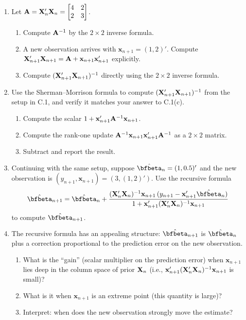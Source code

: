 \documentclass{article}
\begin{document}
\begin{enumerate}[label=\textbf{C.\arabic*},leftmargin=*,itemsep=10pt]

\item  Let ${\mathbf A} = {\mathbf X}_n'{\mathbf X}_n = \begin{bmatrix}4 & 2\\ 2 & 3\end{bmatrix}$.
\begin{enumerate}[label=(\alph*)]
  \item Compute ${\mathbf A}^{-1}$ by the $2\times 2$ inverse formula.
  \item A new observation arrives with $\bm x_{n+1} = (1, 2)'$.  Compute ${\mathbf X}_{n+1}'{\mathbf X}_{n+1} = {\mathbf A} + \mathbf x_{n+1}\mathbf x_{n+1}'$ explicitly.
  \item Compute $({\mathbf X}_{n+1}'{\mathbf X}_{n+1})^{-1}$ directly using the $2\times 2$ inverse formula.
\end{enumerate}

\item  Use the Sherman--Morrison formula to compute $({\mathbf X}_{n+1}'{\mathbf X}_{n+1})^{-1}$ from the setup in C.1, and verify it matches your answer to C.1(c).
\begin{enumerate}[label=(\alph*)]
  \item Compute the scalar $1 + \mathbf x_{n+1}'{\mathbf A}^{-1}\mathbf x_{n+1}$.
  \item Compute the rank-one update ${\mathbf A}^{-1}\mathbf x_{n+1}\mathbf x_{n+1}'{\mathbf A}^{-1}$ as a $2\times 2$ matrix.
  \item Subtract and report the result.
\end{enumerate}

\item  Continuing with the same setup, suppose $\hat\bfbeta_n = (1, 0.5)'$ and the new observation is $(y_{n+1}, \bm x_{n+1}) = (3, (1, 2)')$.  Use the recursive formula
$$\hat\bfbeta_{n+1} = \hat\bfbeta_n + \frac{(\bfX_n'\bfX_n)^{-1}\bm x_{n+1}\,(y_{n+1} - \bm x_{n+1}'\hat\bfbeta_n)}{1 + \bm x_{n+1}'(\bfX_n'\bfX_n)^{-1}\bm x_{n+1}}$$
to compute $\hat\bfbeta_{n+1}$.

\item  The recursive formula has an appealing structure: $\hat\bfbeta_{n+1}$ is $\hat\bfbeta_n$ plus a correction proportional to the prediction error on the new observation.
\begin{enumerate}[label=(\alph*)]
  \item What is the ``gain'' (scalar multiplier on the prediction error) when $\bm x_{n+1}$ lies deep in the column space of prior ${\mathbf X}_n$ (i.e., $\mathbf x_{n+1}'({\mathbf X}_n'{\mathbf X}_n)^{-1}\mathbf x_{n+1}$ is small)?
  \item What is it when $\bm x_{n+1}$ is an extreme point (this quantity is large)?
  \item Interpret: when does the new observation strongly move the estimate?
\end{enumerate}


\end{enumerate}
\end{document}
